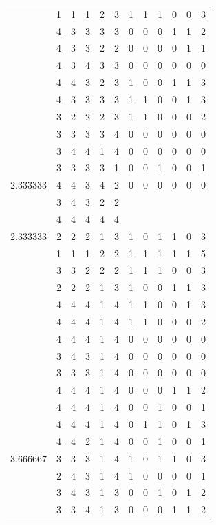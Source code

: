 \documentclass[]{book}
\theoremstyle{definition}
\theoremstyle{definition}
\theoremstyle{definition}
\theoremstyle{remark}
\begin{document}
\begin{table}
{\begin{tabular}[t]{rrrrrrrrrrrr}
 & 1 & 1 & 1 & 2 & 3 & 1 & 1 & 1 & 0 & 0 & 3\\
 & 4 & 3 & 3 & 3 & 3 & 0 & 0 & 0 & 1 & 1 & 2\\
 & 4 & 3 & 3 & 2 & 2 & 0 & 0 & 0 & 0 & 1 & 1\\
 & 4 & 3 & 4 & 3 & 3 & 0 & 0 & 0 & 0 & 0 & 0\\
 & 4 & 4 & 3 & 2 & 3 & 1 & 0 & 0 & 1 & 1 & 3\\
 & 4 & 3 & 3 & 3 & 3 & 1 & 1 & 0 & 0 & 1 & 3\\
 & 3 & 2 & 2 & 2 & 3 & 1 & 1 & 0 & 0 & 0 & 2\\
 & 3 & 3 & 3 & 3 & 4 & 0 & 0 & 0 & 0 & 0 & 0\\
 & 3 & 4 & 4 & 1 & 4 & 0 & 0 & 0 & 0 & 0 & 0\\
 & 3 & 3 & 3 & 3 & 1 & 0 & 0 & 1 & 0 & 0 & 1\\
2.333333 & 4 & 4 & 3 & 4 & 2 & 0 & 0 & 0 & 0 & 0 & 0\\
 & 3 & 4 & 3 & 2 & 2 &  &  &  &  &  & \\
 & 4 & 4 & 4 & 4 & 4 &  &  &  &  &  & \\
2.333333 & 2 & 2 & 2 & 1 & 3 & 1 & 0 & 1 & 1 & 0 & 3\\
 & 1 & 1 & 1 & 2 & 2 & 1 & 1 & 1 & 1 & 1 & 5\\
 & 3 & 3 & 2 & 2 & 2 & 1 & 1 & 1 & 0 & 0 & 3\\
 & 2 & 2 & 2 & 1 & 3 & 1 & 0 & 0 & 1 & 1 & 3\\
 & 4 & 4 & 4 & 1 & 4 & 1 & 1 & 0 & 0 & 1 & 3\\
 & 4 & 4 & 4 & 1 & 4 & 1 & 1 & 0 & 0 & 0 & 2\\
 & 4 & 4 & 4 & 1 & 4 & 0 & 0 & 0 & 0 & 0 & 0\\
 & 3 & 4 & 3 & 1 & 4 & 0 & 0 & 0 & 0 & 0 & 0\\
 & 3 & 3 & 3 & 1 & 4 & 0 & 0 & 0 & 0 & 0 & 0\\
 & 4 & 4 & 4 & 1 & 4 & 0 & 0 & 0 & 1 & 1 & 2\\
 & 4 & 4 & 4 & 1 & 4 & 0 & 0 & 1 & 0 & 0 & 1\\
 & 4 & 4 & 4 & 1 & 4 & 0 & 1 & 1 & 0 & 1 & 3\\
 & 4 & 4 & 2 & 1 & 4 & 0 & 0 & 1 & 0 & 0 & 1\\
3.666667 & 3 & 3 & 3 & 1 & 4 & 1 & 0 & 1 & 1 & 0 & 3\\
 & 2 & 4 & 3 & 1 & 4 & 1 & 0 & 0 & 0 & 0 & 1\\
 & 3 & 4 & 3 & 1 & 3 & 0 & 0 & 1 & 0 & 1 & 2\\
 & 3 & 3 & 4 & 1 & 3 & 0 & 0 & 0 & 1 & 1 & 2\\

\end{tabular}}
\end{table}
\end{document}
